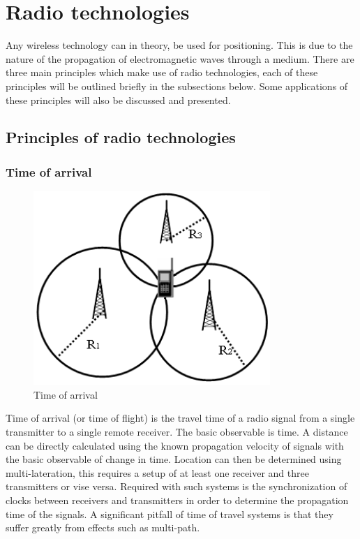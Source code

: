 \documentclass[11pt,a4paper]{report}
\begin{document}
	\section{Radio technologies}
		Any wireless technology can in theory, be used for positioning. This is due to the nature of the propagation of electromagnetic waves through a medium. There are three main principles which make use of radio technologies, each of these principles will be outlined briefly in the subsections below. Some applications of these principles will also be discussed and presented.
	
	\subsection{Principles of radio technologies}
		\subsubsection{Time of arrival}
			\begin{figure}[h!]
				\centering
				\includegraphics[width=0.8\textwidth]{time_of_arrival}
				\caption{Time of arrival}
				\label{fig:time_of_arrival}
			\end{figure}
			
			Time of arrival (or time of flight) is the travel time of a radio signal from a single transmitter to a single remote receiver. The basic observable is time. A distance can be directly calculated using the known propagation velocity of signals with the basic observable of change in time. Location can then be determined using multi-lateration, this requires a setup of at least one receiver and three transmitters or vise versa.
			Required with such systems is the synchronization of clocks between receivers and transmitters in order to determine the propagation time of the signals.
			A significant pitfall of time of travel systems is that they suffer greatly from effects such as multi-path.
			\cite{k._pahlavan_wideband_1998}
			
\end{document}
